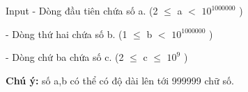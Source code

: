 Input
- Dòng đầu tiên chứa số a. (2  $\le$  a $<$ $10^{1000000}$    )   



    - Dòng thứ hai chứa số b. (1  $\le$  b $<$ $10^{1000000}$    )   



    - Dòng chứ ba chứa số c. (2 $\le$ c $\le$ $10^{9}$    )   



\textbf{     Chú ý:    }    số a,b có thể có độ dài lên tới 999999 chữ số.